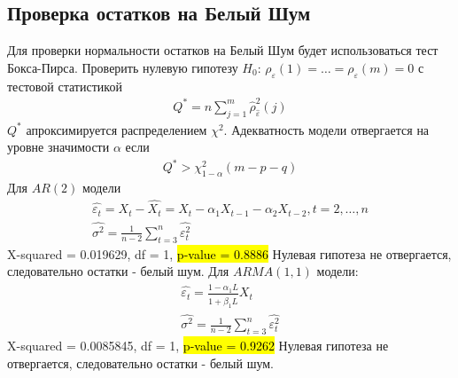 \documentclass{article}
\begin{document}
\subsection{Проверка остатков на Белый Шум}
Для проверки нормальности остатков на Белый Шум будет использоваться тест Бокса-Пирса. Проверить нулевую гипотезу $H_0$: $\rho_\varepsilon(1)=\ldots=\rho_\varepsilon(m)=0$ с тестовой статистикой
\begin{gather*}
    Q^{\ast}=n\sum_{j=1}^{m}\hat{\rho}^2_{\hat{\varepsilon}}(j)
\end{gather*}
$Q^{\ast}$ апроксимируется распределением $\chi^2$. Адекватность модели отвергается на уровне значимости $\alpha$ если
\begin{gather*}
     Q^{\ast}>\chi_{1-\alpha}^{2}(m-p-q)
\end{gather*}
Для $AR(2)$ модели 
\begin{gather*}
    \hat{\varepsilon_t}=X_t-\hat{X_t}=X_t -\alpha_1X_{t-1} - \alpha_2X_{t-2}, t = 2,\ldots,n\\
    \hat{\sigma^2}=\frac{1}{n-2}\sum_{t=3}^{n}\hat{\varepsilon^2_t}
\end{gather*}
X-squared = 0.019629, df = 1, \hl{p-value = 0.8886} \newline
Нулевая гипотеза не отвергается, следовательно  остатки - белый шум.
Для $ARMA(1,1)$ модели:
\begin{gather*}
    \hat{\varepsilon_t}=\frac{1-\hat{\alpha_1}L}{1+\hat{\beta_1}L}X_t\\
    \hat{\sigma^2}=\frac{1}{n-2}\sum_{t=3}^{n}\hat{\varepsilon^2_t}
\end{gather*}
X-squared = 0.0085845, df = 1, \hl{p-value = 0.9262}\newline
Нулевая гипотеза не отвергается, следовательно  остатки - белый шум.
\newpage
\end{document}
